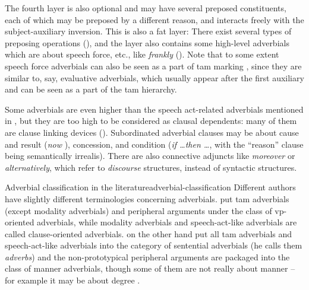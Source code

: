\documentclass[UTF8, a4paper, oneside, scheme=plain, 12pt]{ctexbook}
\newcommand*{\citesec}[1]{\S~{#1}}
\newcommand*{\citepage}[1]{p.~{#1}}
\newcommand*{\term}[1]{\emph{#1}}
\newcommand{\form}[1]{\emph{#1}}
\begin{document}
The fourth layer is also optional and may have several preposed constituents,
each of which may be preposed by a different reason,
and interacts freely with the subject-auxiliary inversion.
This is also a fat layer:
There exist several types of preposing operations (),
and the layer also contains some high-level adverbials
which are about speech force, etc., %
like \form{frankly} ().
Note that to some extent speech force adverbials 
can also be seen as a part of \acs{tam} marking
\citep[\citesec{4.4}]{cinque1999adverbs},
since they are similar to, say, evaluative adverbials, 
which usually appear after the first auxiliary 
and can be seen as a part of the \acs{tam} hierarchy.




Some adverbials are even higher than the speech act-related adverbials 
mentioned in ,
but they are too high to be considered as clausal dependents:
many of them are clause linking devices ().
Subordinated adverbial clauses may be about 
cause and result (\form{now }), 
concession, 
and condition (\form{if \dots then \dots}, with the ``reason'' clause being semantically irrealis).
There are also connective adjuncts like \form{moreover} or \form{alternatively},
which refer to \emph{discourse} structures, instead of syntactic structures.



\begin{infobox}{Adverbial classification in the literature}{adverbial-classification}
    Different authors have slightly different terminologies concerning adverbials.
    \citet[\citepage{576}]{cgel} put \acs{tam} adverbials (except modality adverbials) 
    and peripheral arguments
    under the class of \acs{vp}-oriented adverbials, 
    while modality adverbials and speech-act-like adverbials are called clause-oriented adverbials.
    \citet[\citepage{386}]{dixon2005semantic} on the other hand 
    put all \acs{tam} adverbials and speech-act-like adverbials 
    into the category of sentential adverbials (he calls them \term{adverbs})
    and the non-prototypical peripheral arguments are packaged into the class of manner adverbials,
    though some of them are not really about manner -- 
    for example it may be about degree \citet[\citepage{576}]{cgel}.
\end{infobox}
\end{document}
